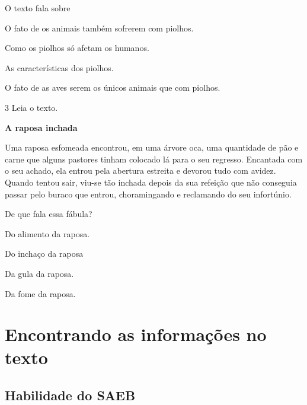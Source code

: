 O texto fala sobre

\begin{escolha}
\item O fato de os animais também sofrerem com piolhos.

\item Como os piolhos só afetam os humanos.

\item As características dos piolhos.

\item O fato de as aves serem os únicos animais que com piolhos.
\end{escolha}


\num{3} Leia o texto.

\begin{myquote}
\textbf{A raposa inchada}

Uma raposa esfomeada encontrou, em uma árvore oca, uma quantidade de pão e
carne que alguns pastores tinham colocado lá para o seu regresso.
Encantada com o seu achado, ela entrou pela abertura estreita e devorou
tudo com avidez. Quando tentou sair, viu-se tão inchada depois da sua
refeição que não conseguia passar pelo buraco que entrou, choramingando e reclamando do seu infortúnio.

\end{myquote}

De que fala essa fábula?

\begin{escolha}
\item Do alimento da raposa.

\item Do inchaço da raposa

\item Da gula da raposa.

\item Da fome da raposa.
\end{escolha}

\chapter[Encontrando as informações no texto]{\Large Encontrando as informações no texto}

\section*{Habilidade do SAEB}

